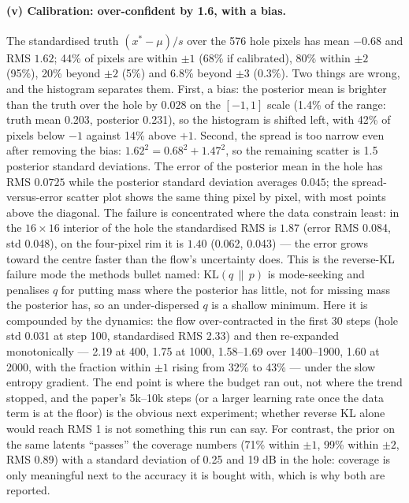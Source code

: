 \documentclass[11pt]{article}
\begin{document}
\paragraph{(v) Calibration: over-confident by 1.6, with a bias.} The
standardised truth $(x^{*} - \mu)/s$ over the 576 hole pixels has mean
$-0.68$ and RMS $1.62$; 44\% of pixels are within $\pm 1$ (68\% if
calibrated), 80\% within $\pm 2$ (95\%), 20\% beyond $\pm 2$ (5\%) and 6.8\%
beyond $\pm 3$ (0.3\%). Two things are wrong, and the histogram separates
them. First, a bias: the posterior mean is brighter than the truth over the
hole by $0.028$ on the $[-1, 1]$ scale (1.4\% of the range: truth mean 0.203,
posterior 0.231), so the histogram is shifted left, with 42\% of pixels below
$-1$ against 14\% above $+1$. Second, the spread is too narrow even after
removing the bias: $1.62^{2} = 0.68^{2} + 1.47^{2}$, so the remaining scatter
is 1.5 posterior standard deviations. The error of the posterior mean in the
hole has RMS $0.0725$ while the posterior standard deviation averages
$0.045$; the spread-versus-error scatter plot shows the same thing pixel by
pixel, with most points above the diagonal. The failure is concentrated
where the data constrain least: in the $16 \times 16$ interior of the hole
the standardised RMS is $1.87$ (error RMS 0.084, std 0.048), on the four-pixel
rim it is $1.40$ (0.062, 0.043) --- the error grows toward the centre faster
than the flow's uncertainty does. This is the reverse-KL failure mode the
methods bullet named: $\mathrm{KL}(q \,\|\, p)$ is mode-seeking and
penalises $q$ for putting mass where the posterior has little, not for
missing mass the posterior has, so an under-dispersed $q$ is a shallow
minimum. Here it is compounded by the dynamics: the flow over-contracted
in the first 30 steps (hole std 0.031 at step 100, standardised RMS 2.33)
and then re-expanded monotonically --- 2.19 at 400, 1.75 at 1000, 1.58--1.69
over 1400--1900, 1.60 at 2000, with the fraction within $\pm 1$ rising from
32\% to 43\% --- under the slow entropy gradient. The end point is where the
budget ran out, not where the trend stopped, and the paper's 5k--10k
steps (or a larger learning rate once the data term is at the floor) is the
obvious next experiment; whether reverse KL alone would reach RMS 1 is not
something this run can say. For contrast, the prior on the same latents
``passes'' the coverage numbers (71\% within $\pm 1$, 99\% within $\pm 2$,
RMS 0.89) with a standard deviation of 0.25 and 19 dB in the hole: coverage
is only meaningful next to the accuracy it is bought with, which is why
both are reported.
\end{document}
